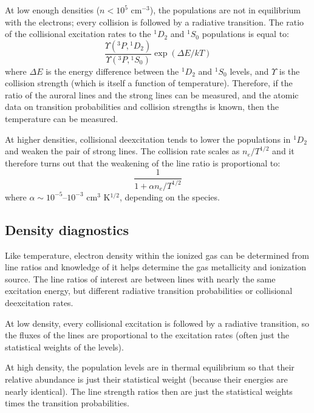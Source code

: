 At low enough densities ($n<10^5$ cm$^{-3}$), the populations are not
in equilibrium with the electrons; every collision is followed by a
radiative transition.  The ratio of the collisional excitation rates
to the ${}^{1}D_2$ and ${}^1S_0$ populations is equal to:
\begin{equation}
\frac{\Upsilon({}^3P, {}^{1}D_2)}
{\Upsilon({}^3P, {}^1S_0)} \exp\left(\Delta E / kT \right)
\end{equation}
where $\Delta E$ is the energy difference between the ${}^{1}D_2$ and
${}^1S_0$ levels, and $\Upsilon$ is the collision strength (which is
itself a function of temperature). Therefore, if the ratio of the
auroral lines and the strong lines can be measured, and the atomic
data on transition probabilities and collision strengths is known,
then the temperature can be measured.

At higher densities, collisional deexcitation tends to lower the
 populations in ${}^{1}D_2$ and weaken the pair of strong lines. The
 collision rate scales as $n_e/T^{1/2}$ and it therefore turns out
 that the weakening of the line ratio is proportional to:
 \begin{equation}
\frac{1}{1 + \alpha n_e / T^{1/2}}
 \end{equation} where $\alpha \sim 10^{-5}$--$10^{-3}$ cm$^{3}$
K$^{1/2}$, depending on the species.

\subsection{Density diagnostics}

Like temperature, electron density within the ionized gas can be
determined from line ratios and knowledge of it helps determine the
gas metallicity and ionization source. The line ratios of interest are
between lines with nearly the same excitation energy, but different
radiative transition probabilities or collisional deexcitation rates.

At low density, every collisional excitation is followed by a
radiative transition, so the fluxes of the lines are proportional to
the excitation rates (often just the statistical weights of the
levels).

At high density, the population levels are in thermal equilibrium so
that their relative abundance is just their statistical weight
(because their energies are nearly identical). The line strength
ratios then are just the statistical weights times the transition
probabilities. 

